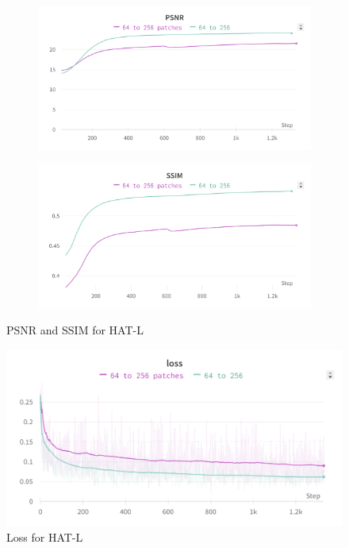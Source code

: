\begin{figure}[H]
  \centering
  \begin{subfigure}{.5\textwidth}
    \centering
    \includegraphics[width=1\linewidth]{figures/HATL_PSNR.png}
    \label{fig:hatl_psnr}
  \end{subfigure}%
  \begin{subfigure}{.5\textwidth}
    \centering
    \includegraphics[width=1\linewidth]{figures/HATL_SSIM.png}
    \label{fig:hatl_ssim}
  \end{subfigure}
  \caption{PSNR and SSIM for HAT-L}
  \label{fig:hatl_metrics}
\end{figure}

\begin{figure}[H]
  \centering
  \includegraphics[scale=0.14]{figures/HATL_loss.png}
  \caption{Loss for HAT-L}
  \label{img:hatl_loss}
\end{figure}

